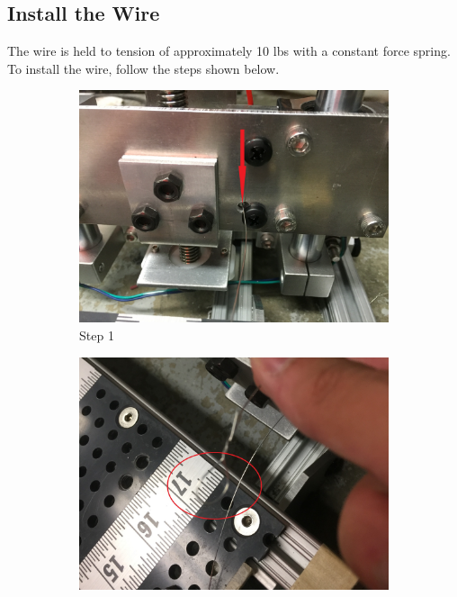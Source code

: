 \documentclass[titlepage,12pt,letter]{report}
\numberwithin{equation}{chapter}
\begin{document}
\newpage
\subsection{Install the Wire}
The wire is held to tension of approximately 10 lbs with a constant force spring. To install the wire, follow the steps shown below.

\begin{enumerate}[noitemsep,topsep=0pt]
\begin{figure}[H]
	\centering
	\begin{subfigure}[b]{.475\textwidth}
		\centering
		\includegraphics[width=\textwidth]{./Figures/Wire_mounting/1.jpg}
		\caption{Step 1}
	\end{subfigure}
	\begin{subfigure}[b]{.475\textwidth}
		\centering
		\includegraphics[width=\textwidth]{./Figures/Wire_mounting/2.jpg}

\end{subfigure}
\end{figure}
\end{enumerate}
\end{document}
